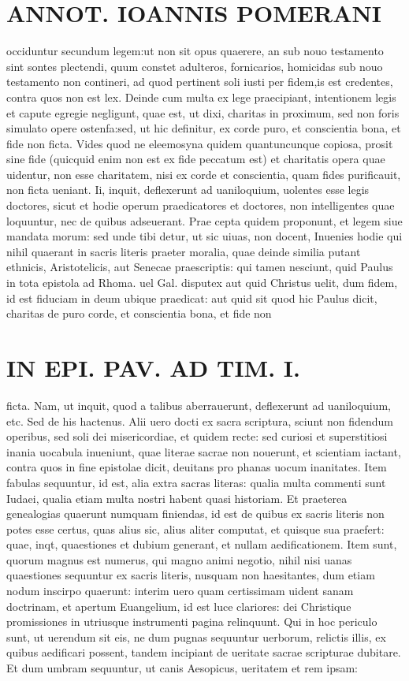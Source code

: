 \documentclass{article}
\begin{document}
\begin{pages}
\section*{ANNOT. IOANNIS POMERANI }\pstart occiduntur secundum legem:ut non sit opus quaerere, an sub nouo testamento sint sontes plectendi, quum constet adulteros, fornicarios, homicidas sub nouo testamento non contineri, ad quod pertinent soli iusti per fidem,is est credentes, contra quos non est lex. Deinde cum multa ex lege praecipiant, intentionem legis et capute egregie negligunt, quae est, ut dixi, charitas in proximum, sed non foris simulato opere ostenfa:sed, ut hic definitur, ex corde puro, et conscientia bona, et fide non ficta. Vides quod ne eleemosyna quidem quantuncunque copiosa, prosit sine fide (quicquid enim non est ex fide peccatum est) et charitatis opera quae uidentur, non esse charitatem, nisi ex corde et conscientia, quam fides purificauit, non ficta ueniant. Ii, inquit, deflexerunt ad uaniloquium, uolentes esse legis doctores, sicut et hodie operum praedicatores et doctores, non intelligentes quae loquuntur, nec de quibus adseuerant. Prae cepta quidem proponunt, et legem siue mandata morum: sed unde tibi detur, ut sic uiuas, non docent, Inuenies hodie qui nihil quaerant in sacris literis praeter moralia, quae deinde similia putant ethnicis, Aristotelicis, aut Senecae praescriptis: qui tamen nesciunt, quid Paulus in tota epistola ad Rhoma. uel Gal. disputex aut quid Christus uelit, dum fidem, id est fiduciam in deum ubique  praedicat: aut quid sit quod hic Paulus dicit, charitas de puro corde, et conscientia bona, et fide non  \pend
\section*{IN EPI. PAV. AD TIM. I. }
\marginpar{[ p.81 ]}\pstart ficta. Nam, ut inquit, quod a talibus aberrauerunt, deflexerunt ad uaniloquium, etc. Sed de his hactenus. Alii uero docti ex sacra scriptura, sciunt non fidendum operibus, sed soli dei misericordiae, et quidem recte: sed curiosi et superstitiosi inania uocabula inueniunt, quae literae sacrae non nouerunt, et scientiam iactant, contra quos in fine epistolae dicit, deuitans pro phanas uocum inanitates. Item fabulas sequuntur, id est, alia extra sacras literas: qualia multa commenti sunt Iudaei, qualia etiam multa nostri habent quasi historiam. Et praeterea genealogias quaerunt numquam finiendas, id est de quibus ex sacris literis non potes esse certus, quas alius sic, alius aliter computat, et quisque  sua praefert: quae, inqt, quaestiones et dubium generant, et nullam aedificationem. Item sunt, quorum magnus est numerus, qui magno animi negotio, nihil nisi uanas quaestiones sequuntur ex sacris literis, nusquam non haesitantes, dum etiam nodum inscirpo quaerunt: interim uero quam certissimam uident sanam doctrinam, et apertum Euangelium, id est luce clariores: dei Christique  promissiones in utriusque  instrumenti pagina relinquunt. Qui in hoc periculo sunt, ut uerendum sit eis, ne dum pugnas sequuntur uerborum, relictis illis, ex quibus aedificari possent, tandem incipiant de ueritate sacrae scripturae dubitare. Et dum umbram sequuntur, ut canis Aesopicus, ueritatem et rem ipsam:  \pend

\end{pages}
\end{document}
